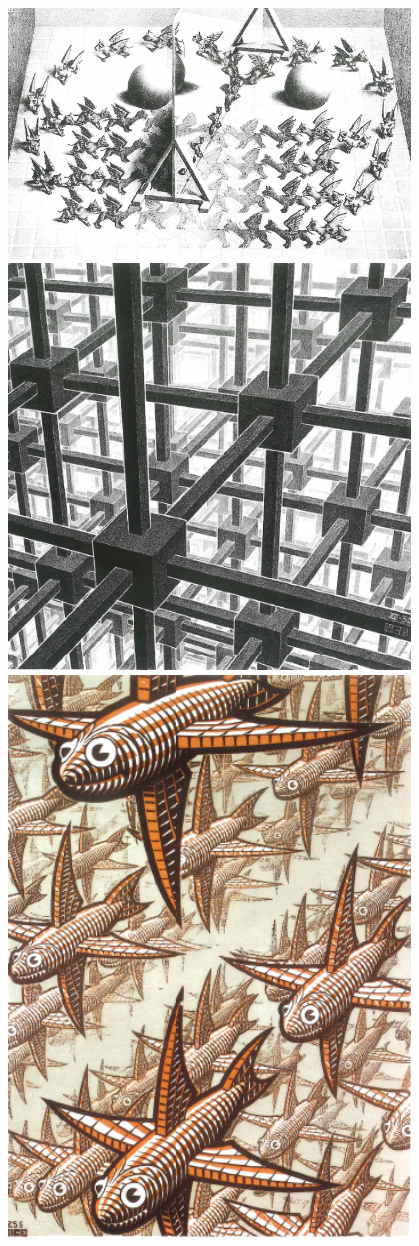 \documentclass[a4paper]{report}
\theoremstyle{definition}
\begin{document}
\begin{center}
    \includegraphics[width=0.8\textwidth]{escher8}
    \includegraphics[width=0.8\textwidth]{escher9}
    \includegraphics[width=0.8\textwidth]{escher10}
  \end{center}
\end{document}
